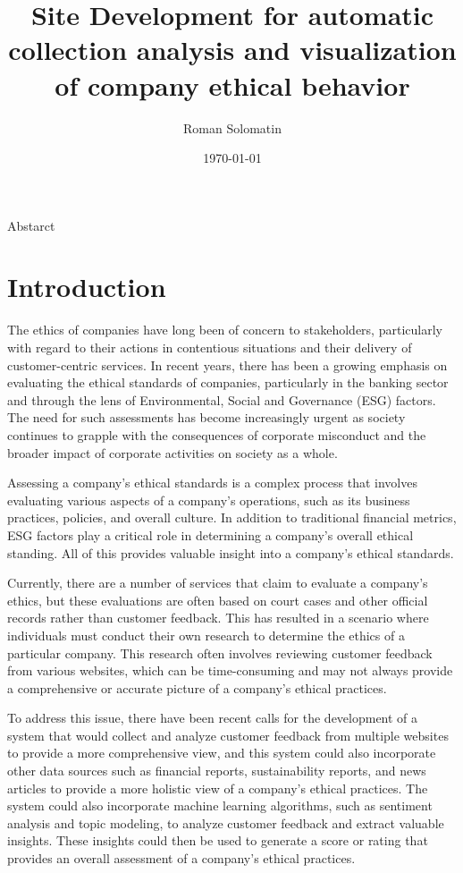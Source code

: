 \documentclass[PI]{ProjectProposal}
\author{Roman Solomatin}
\date{\today}
\title{Site Development for automatic collection analysis and visualization of company ethical behavior}
\begin{document}
\maketitle
Abstarct

\chapter{Introduction}
\label{sec:org5ff4ef8}
The ethics of companies have long been of concern to stakeholders, particularly with regard to their actions in contentious situations and their delivery of customer-centric services. In recent years, there has been a growing emphasis on evaluating the ethical standards of companies, particularly in the banking sector and through the lens of Environmental, Social and Governance (ESG) factors\autocites{mure_esg_2021}[][]{miralles-quiros_esg_2019}[][]{climent_ethical_2018}. The need for such assessments has become increasingly urgent as society continues to grapple with the consequences of corporate misconduct and the broader impact of corporate activities on society as a whole.

Assessing a company's ethical standards is a complex process that involves evaluating various aspects of a company's operations, such as its business practices, policies, and overall culture. In addition to traditional financial metrics, ESG factors play a critical role in determining a company's overall ethical standing. All of this provides valuable insight into a company's ethical standards.

Currently, there are a number of services that claim to evaluate a company's ethics, but these evaluations are often based on court cases and other official records rather than customer feedback. This has resulted in a scenario where individuals must conduct their own research to determine the ethics of a particular company. This research often involves reviewing customer feedback from various websites, which can be time-consuming and may not always provide a comprehensive or accurate picture of a company's ethical practices.

To address this issue, there have been recent calls for the development of a system that would collect and analyze customer feedback from multiple websites to provide a more comprehensive view, and this system could also incorporate other data sources such as financial reports, sustainability reports, and news articles to provide a more holistic view of a company's ethical practices. The system could also incorporate machine learning algorithms, such as sentiment analysis and topic modeling, to analyze customer feedback and extract valuable insights. These insights could then be used to generate a score or rating that provides an overall assessment of a company's ethical practices.
\end{document}
